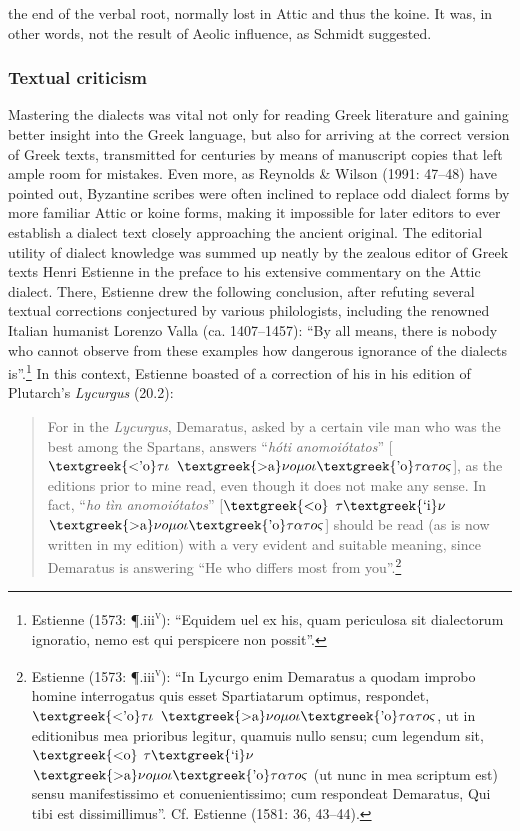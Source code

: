 \documentclass[output=paper]{langsci/langscibook}
\begin{document}
the end of the verbal root, normally lost in Attic and thus the koine. It was, in other words, not the result of Aeolic influence, as Schmidt suggested.

\subsubsection{Textual criticism}
\hypertarget{Toc19704822}{}
Mastering the dialects was vital not only for reading Greek literature and gaining better insight into the Greek language, but also for arriving at the correct version of Greek texts, transmitted for centuries by means of manuscript copies that left ample room for mistakes. Even more, as Reynolds \& Wilson (1991: 47–48) have pointed out, Byzantine scribes were often inclined to replace odd dialect forms by more familiar Attic or koine forms, making it impossible for later editors to ever establish a dialect text closely approaching the ancient original. The editorial utility of dialect knowledge was summed up neatly by the zealous editor of Greek texts Henri Estienne in the preface to his extensive commentary on the Attic dialect. There, Estienne drew the following conclusion, after refuting several textual corrections conjectured by various philologists, including the renowned Italian humanist Lorenzo Valla (ca. 1407–1457): “By all means, there is nobody who cannot observe from these examples how dangerous ignorance of the dialects is”.\footnote{Estienne (1573: ¶.iii\textsc{\textsuperscript{v}}): “Equidem uel ex his, quam periculosa sit dialectorum ignoratio, nemo est qui perspicere non possit”.} In this context, Estienne boasted of a correction of his in his edition of Plutarch’s \textit{Lycurgus} (20.2):

\begin{quote}
For in the \textit{Lycurgus}, Demaratus, asked by a certain vile man who was the best among the Spartans, answers “\textit{hóti} \textit{anomoiótatos}” [$\text{\textgreek{<'o}}\tau \iota $ $\text{\textgreek{>a}}\nu o\mu o\iota \text{\textgreek{'o}}\tau \alpha \tau o\varsigma $], as the editions prior to mine read, even though it does not make any sense. In fact, “\textit{ho} \textit{tìn} \textit{anomoiótatos}” [$\text{\textgreek{<o}}$ $\tau \text{\textgreek{`i}}\nu $ $\text{\textgreek{>a}}\nu o\mu o\iota \text{\textgreek{'o}}\tau \alpha \tau o\varsigma $] should be read (as is now written in my edition) with a very evident and suitable meaning, since Demaratus is answering “He who differs most from you”.\footnote{Estienne (1573: ¶.iii\textsc{\textsuperscript{v}}): “In Lycurgo enim Demaratus a quodam improbo homine interrogatus quis esset Spartiatarum optimus, respondet, $\text{\textgreek{<'o}}\tau \iota $ $\text{\textgreek{>a}}\nu o\mu o\iota \text{\textgreek{'o}}\tau \alpha \tau o\varsigma $, ut in editionibus mea prioribus legitur, quamuis nullo sensu; cum legendum sit, $\text{\textgreek{<o}}$ $\tau \text{\textgreek{`i}}\nu $ $\text{\textgreek{>a}}\nu o\mu o\iota \text{\textgreek{'o}}\tau \alpha \tau o\varsigma $ (ut nunc in mea scriptum est) sensu manifestissimo et conuenientissimo; cum respondeat Demaratus, Qui tibi est dissimillimus”. Cf. Estienne (1581: 36, 43–44).}
\end{quote}
\end{document}
